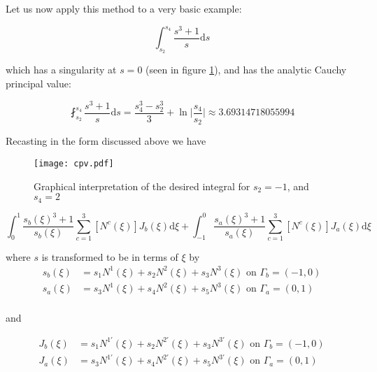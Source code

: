 Let us now apply this method to a very basic example:

\begin{equation}
\int_{s_2}^{s_4} \frac{s^3+1}{s} \mathrm{d}s
\end{equation}

which has a singularity at $s=0$ (seen in figure \ref{fig:cpv}), and has the analytic Cauchy principal value:

\begin{equation}
\fint_{s_2}^{s_4} \frac{s^3+1}{s} \mathrm{d}s = \frac{s_4^3-s_2^3}{3} + \ln \bigl| \frac{s_4}{s_2} \bigr| \approx 3.69314718055994
\end{equation}


Recasting in the form discussed above we have


\begin{figure}[htb]
	\centering
	\texttt{[image: cpv.pdf]}
	\caption{Graphical interpretation of the desired integral for $s_2=-1$, and $s_4=2$}
	\label{fig:cpv}
\end{figure}


\begin{equation}
\int_{0}^{1} \frac{s_b(\xi)^3+1}{s_b(\xi)} \sum^{3}_{c=1} \left[ N^c(\xi) \right] J_b(\xi) \mathrm{d}\xi +\int_{-1}^{0} \frac{s_a(\xi)^3+1}{s_a(\xi)} \sum^{3}_{c=1} \left[ N^c(\xi) \right] J_a(\xi) \mathrm{d}\xi
\end{equation}

where $s$ is transformed to be in terms of $\xi$ by
\begin{equation}
\begin{aligned}
s_b(\xi) &= s_1N^1(\xi) + s_2N^2(\xi) + s_3N^3(\xi) \text{  on  } \Gamma_b = (-1,0)\\
s_a(\xi) &= s_3N^1(\xi) + s_4N^2(\xi) + s_5N^3(\xi) \text{  on  } \Gamma_a = (0,1)\\
\end{aligned}
\end{equation}

and

\begin{equation}
\begin{aligned}
J_b(\xi) &= s_1N^{1'}(\xi) + s_2N^{2'}(\xi) + s_3N^{3'}(\xi) \text{  on  } \Gamma_b = (-1,0)\\
J_a(\xi) &= s_3N^{1'}(\xi) + s_4N^{2'}(\xi) + s_5N^{3'}(\xi) \text{  on  } \Gamma_a = (0,1)\\
\end{aligned}
\end{equation}

